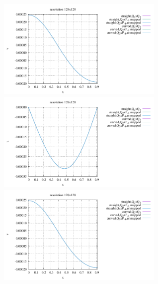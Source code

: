 \begin{center}
\includegraphics[width=8cm]{python_codes/fieldstone_25/results/isoviscous/interface_v_128.pdf}\\
\includegraphics[width=8cm]{python_codes/fieldstone_25/results/isoviscous/interface_u_160.pdf}
\includegraphics[width=8cm]{python_codes/fieldstone_25/results/isoviscous/interface_v_160.pdf}\\
\end{center}

